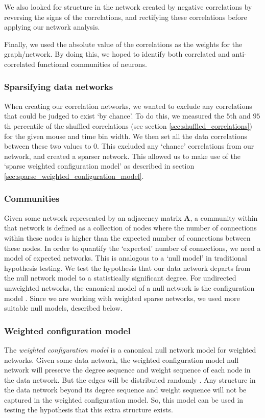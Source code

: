 \documentclass[a4paper,12pt]{article}
\theoremstyle{definition}
\begin{document}
        We also looked for structure in the network created by negative correlations by reversing the signs of the correlations, and rectifying these correlations before applying our network analysis.

        Finally, we used the absolute value of the correlations as the weights for the graph/network. By doing this, we hoped to identify both correlated and anti-correlated functional communities of neurons.

        \subsubsection{Sparsifying data networks}\label{sec:sparsifying_data_networks}
        When creating our correlation networks, we wanted to exclude any correlations that could be judged to exist `by chance'. To do this, we measured the $5$th and $95$th percentile of the shuffled correlations (see section \ref{sec:shuffled_correlations}) for the given mouse and time bin width. We then set all the data correlations between these two values to $0$. This excluded any `chance' correlations from our network, and created a sparser network. This allowed us to make use of the `sparse weighted configuration model' as described in section \ref{sec:sparse_weighted_configuration_model}.

        \subsubsection{Communities}
        Given some network represented by an adjacency matrix $\mathbf{A}$, a community within that network is defined as a collection of nodes where the number of connections within these nodes is higher than the expected number of connections between these nodes. In order to quantify the `expected' number of connections, we need a model of expected networks. This is analogous to a `null model' in traditional hypothesis testing. We test the hypothesis that our data network departs from the null network model to a statistically significant degree. For undirected unweighted networks, the canonical model of a null network is the configuration model \cite{fosdick}. Since we are working with weighted sparse networks, we used more suitable null models, described below.

        \subsubsection{Weighted configuration model}\label{sec:weight_configuration_model}
        The \textit{weighted configuration model} is a canonical null network model for weighted networks. Given some data network, the weighted configuration model null network will preserve the degree sequence and weight sequence of each node in the data network. But the edges will be distributed randomly \cite{fosdick}. Any structure in the data network beyond its degree sequence and weight sequence will not be captured in the weighted configuration model. So, this model can be used in testing the hypothesis that this extra structure exists.
\end{document}
